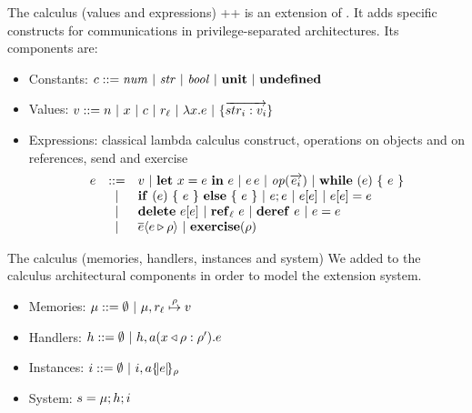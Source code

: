 \documentclass[11pt]{beamer}
\begin{document}
\begin{frame}{The calculus (values and expressions)}
\ljs++ is an extension of \ljs. It adds specific constructs for communications in privilege-separated architectures. Its components are:

\begin{itemize}
\item Constants: $c ::= \mathit{num} ~|~ \mathit{str} ~|~ \mathit{bool} ~|~ \unit ~|~ \undef$
\item Values: $v ::= n ~|~ x ~|~ c ~|~ r_{\ell} ~|~ \lam{x}{e} ~|~ \rec{\vec{str_i:v_i}}$
\item Expressions: classical lambda calculus construct, operations on objects and on references, send and exercise
$$
\begin{array}{ccl}
e & ::= & v ~|~ \letexpr{x}{e}{e} ~|~ \appl{e}{e} ~|~ \op(\vec{e_i}) ~|~ \while{e}{e}\\
& | & \cond{e}{e}{e} ~|~  e;e ~|~ \lookup{e}{e} ~|~ \store{e}{e}{e} \\
& | & \delete{e}{e} ~|~ \newref{\ell}{e} ~|~ \deref{e} ~|~ \setref{e}{e} \\
& | & \send{e}{e}{\rho} ~|~ \exercise{\rho}
\end{array}$$
\end{itemize}
\end{frame}

\begin{frame}{The calculus (memories, handlers, instances and system)}
We added to the calculus architectural components in order to model the extension system.
\begin{itemize}
\item Memories: $\mu ::= \emptyset ~|~ \mu, \map{r_{\ell}}{\rho}{v}$
\item Handlers: $h ::= \emptyset ~|~ h,\handler{a}{x}{\rho}{e}{\rho'}$
\item Instances: $i ::= \emptyset ~|~ i,\inst{a}{e}{\rho}$
\item System: $s = \sys{\mu}{h}{i}$
\end{itemize}
\end{frame}
\end{document}

